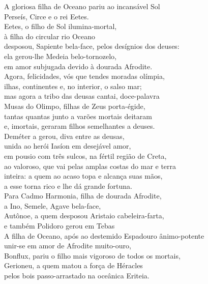 \begin{pages}
\begin{Rightside}
\quad{}A gloriosa filha de Oceano pariu ao incansável Sol\\
Perseís, Circe e o rei Eetes.\\
Eetes, o filho de Sol ilumina-mortal,\\
à filha do circular rio Oceano\\
desposou, Sapiente bela-face, pelos desígnios dos deuses: \\
ela gerou-lhe Medeia belo-tornozelo,\\
em amor subjugada devido à dourada Afrodite.\\[5pt]

Agora, felicidades, vós que tendes moradas olímpia,\\
ilhas, continentes e, no interior, o salso mar;\\
mas agora a tribo das deusas cantai, doce-palavra \\
Musas do Olimpo, filhas de Zeus porta-égide,\\
tantas quantas junto a varões mortais deitaram\\
e, imortais, geraram filhos semelhantes a deuses.\\

\quad{}Deméter a  gerou, diva entre as deusas,\\
unida ao herói Iasíon em desejável amor, \\
em pousio com três sulcos, na fértil região de Creta,\\
ao valoroso, que vai pelas amplas costas do mar e terra\\
inteira: a quem ao acaso topa e alcança suas mãos,\\
a esse torna rico e lhe dá grande fortuna.\\

\quad{}Para Cadmo Harmonia, filha de dourada Afrodite, \\
a Ino, Semele, Agave bela-face,\\
Autônoe, a quem desposou Aristaio cabeleira-farta,\\
e também Polidoro gerou em Tebas \\

\quad{}A filha de Oceano, após ao destemido Espadouro ânimo-potente\\
unir-se em amor de Afrodite muito-ouro, \\
Bonflux, pariu o filho mais vigoroso de todos os mortais,\\
Gerioneu, a quem matou a força de Héracles\\
pelos bois passo-arrastado na oceânica Eriteia.\\


\end{Rightside}
\end{pages}
